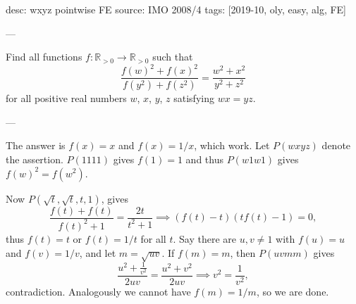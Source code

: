 desc: wxyz pointwise FE
source: IMO 2008/4
tags: [2019-10, oly, easy, alg, FE]

---

Find all functions $f:\mathbb R_{>0}\to\mathbb R_{>0}$ such that \[\frac{f(w)^2+f(x)^2}{f(y^2)+f(z^2)}=\frac{w^2+x^2}{y^2+z^2}\]
for all positive real numbers $w$, $x$, $y$, $z$ satisfying $wx=yz$.

---

The answer is $f(x)=x$ and $f(x)=1/x$, which work. Let $P(wxyz)$ denote the assertion. $P(1111)$ gives $f(1)=1$ and thus $P(w1w1)$ gives $f(w)^2=f(w^2)$.

Now $P(\sqrt t,\sqrt t,t,1)$, gives \[\frac{f(t)+f(t)}{f(t)^2+1}=\frac{2t}{t^2+1}\implies\left(f(t)-t\right)\left(tf(t)-1\right)=0,\]
thus $f(t)=t$ or $f(t)=1/t$ for all $t$. Say there are $u,v\ne1$ with $f(u)=u$ and $f(v)=1/v$, and let $m=\sqrt{uv}$. If $f(m)=m$, then $P(uvmm)$ gives \[\frac{u^2+\frac1{v^2}}{2uv}=\frac{u^2+v^2}{2uv}\implies v^2=\frac1{v^2},\]
contradiction. Analogously we cannot have $f(m)=1/m$, so we are done.
